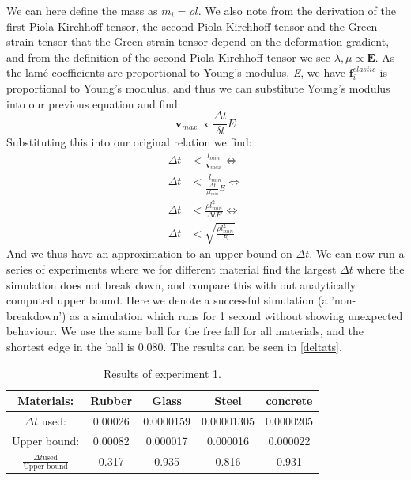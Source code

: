 We can here define the mass as $m_i = \rho l$. We also note from the derivation of the first Piola-Kirchhoff tensor, the second Piola-Kirchhoff tensor and the Green strain tensor that the Green strain tensor depend on the deformation gradient, and from the definition of the second Piola-Kirchhoff tensor we see $\lambda, \mu \propto \mathbf{E}$. As the lamé coefficients are proportional to Young's modulus, \textit{E}, we have $\mathbf{f}^{elastic}_i$ is proportional to Young's modulus, and thus we can substitute Young's modulus into our previous equation and find:
\begin{equation*}
	\mathbf{v}_{max} \propto \frac{\Delta t}{\delta l}E
\end{equation*}
Substituting this into our original relation we find:
\begin{align*}
	\Delta t &< \frac{l_{min}}{\mathbf{v}_{max}} \iff\\
	\Delta t &< \frac{l_{min}}{\frac{\Delta t}{\rho l_{min}}E} \iff\\
	\Delta t &< \frac{\rho l_{min}^2}{\Delta t E} \iff\\
	\Delta t &< \sqrt{\frac{\rho l_{min}^2}{E}}
\end{align*}
And we thus have an approximation to an upper bound on $\Delta t$. We can now run a series of experiments where we for different material find the largest $\Delta t$ where the simulation does not break down, and compare this with out analytically computed upper bound. Here we denote a successful simulation (a 'non-breakdown') as a simulation which runs for 1 second without showing unexpected behaviour. We use the same ball for the free fall for all materials, and the shortest edge in the ball is $0.080$. The results can be seen in \autoref{deltats}.
\begin{table}
	\centering
	\begin{tabular}{|c|c|c|c|c|}
		\hline
		Materials: & Rubber & Glass & Steel & concrete\\
		\hline
		$\Delta t$ used: & 0.00026 & 0.0000159 & 0.00001305 & 0.0000205\\
		\hline
		Upper bound: & 0.00082 & 0.000017 & 0.000016 & 0.000022\\
		\hline
		$\frac{\Delta t \text{used}}{\text{Upper bound}}$ & 0.317 & 0.935 & 0.816 & 0.931 \\
		\hline
	\end{tabular}
	\caption{Results of experiment 1.}
	\label{deltats}
\end{table}

